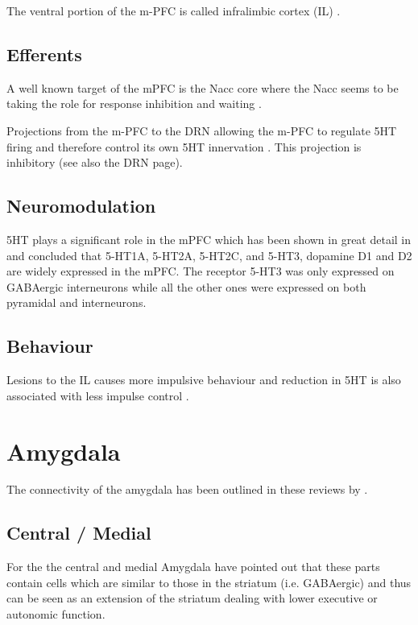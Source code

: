 \documentclass[12pt,a4paper]{article}
\begin{document}
The ventral portion of the m-PFC is called infralimbic cortex (IL)
\citep{Tsutsui-Kimura2016}.

\subsection{Efferents}
A well known target of the mPFC is the Nacc core where the Nacc seems
to be taking the role for response inhibition and waiting
\citep{Neufang2016, Feja2014}.

Projections from the m-PFC to the DRN allowing the m-PFC to regulate
5HT firing and therefore control its own 5HT innervation
\citep{Homberg2012, Juckel1999}. This projection is inhibitory
(see also the DRN page).

\subsection{Neuromodulation}
5HT plays a significant role in the mPFC which has been shown in great
detail in \citep{Santana2017} and concluded that 5-HT1A, 5-HT2A,
5-HT2C, and 5-HT3, dopamine D1 and D2 are widely expressed in the
mPFC. The receptor 5-HT3 was only expressed on GABAergic interneurons
while all the other ones were expressed on both pyramidal and
interneurons.


\subsection{Behaviour}
Lesions to the IL causes more impulsive behaviour
\citep{Tsutsui-Kimura2016} and reduction in 5HT is also associated
with less impulse control \citep{Neufang2016}.









\section{Amygdala}
The connectivity of the amygdala has been outlined in these reviews by
\citet{Alheid2003, Sah2003, Swanson1998}.

\subsection{Central / Medial}
For the the central and medial Amygdala
\citep{Swanson2003, Swanson1998} have pointed out that these
parts contain cells which are similar to those in the striatum
(i.e. GABAergic) and thus can be seen as an extension of the striatum
dealing with lower executive or autonomic function.
\end{document}
